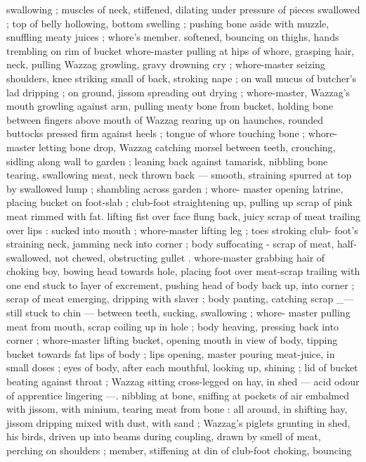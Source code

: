 swallowing ; muscles of neck, stiffened, dilating under pressure of
pieces swallowed ; top of belly hollowing, bottom swelling ; pushing
bone aside with muzzle, snuffling meaty juices ; whore’s member.
softened, bouncing on thighs, hands trembling on rim of bucket
whore-master pulling at hips of whore, grasping hair, neck, pulling
Wazzag growling, gravy drowning cry ; whore-master seizing
shoulders, knee striking small of back, stroking nape ; on wall
mucus of butcher's lad dripping ; on ground, jissom spreading out
drying ; whore-master, Wazzag's mouth growling against arm, pulling
meaty bone from bucket, holding bone between fingers above mouth
of Wazzag rearing up on haunches, rounded buttocks pressed firm
against heels ; tongue of whore touching bone ; whore-master letting
bone drop, Wazzag catching morsel between teeth, crouching, sidling
along wall to garden ; leaning back against tamarisk, nibbling bone
tearing, swallowing meat, neck thrown back --- smooth, straining
spurred at top by swallowed lump ; shambling across garden ; whore-
master opening latrine, placing bucket on foot-slab ; club-foot
straightening up, pulling up scrap of pink meat rimmed with fat.
lifting fist over face flung back, juicy scrap of meat trailing over lips
: sucked into mouth ; whore-master lifting leg ; toes stroking club-
foot's straining neck, jamming neck into corner ; body suffocating -
scrap of meat, half-swallowed, not chewed, obstructing gullet .
whore-master grabbing hair of choking boy, bowing head towards
hole, placing foot over meat-scrap trailing with one end stuck to layer
of excrement, pushing head of body back up, into corner ; scrap of
meat emerging, dripping with slaver ; body panting, catching scrap
_--- still stuck to chin --- between teeth, sucking, swallowing ; whore-
master pulling meat from mouth, scrap coiling up in hole ; body
heaving, pressing back into corner ; whore-master lifting bucket,
opening mouth in view of body, tipping bucket towards fat lips of
body ; lips opening, master pouring meat-juice, in small doses ; eyes
of body, after each mouthful, looking up, shining ; lid of bucket
beating against throat ; Wazzag sitting cross-legged on hay, in shed
--- acid odour of apprentice lingering ---. nibbling at bone, sniffing
at pockets of air embalmed with jissom, with minium, tearing meat
from bone : all around, in shifting hay, jissom dripping mixed with
dust, with sand ; Wazzag's piglets grunting in shed, his birds, driven
up into beams during coupling, drawn by smell of meat, perching on
shoulders ; member, stiffening at din of club-foot choking, bouncing
